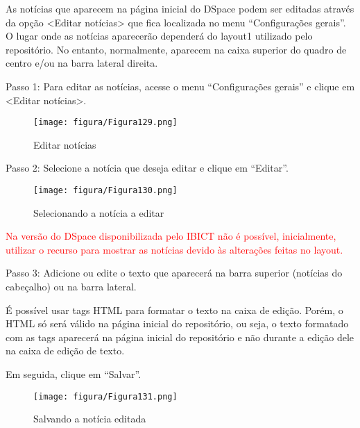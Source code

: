\documentclass[12pt,hidelinks]{article}
\begin{document}
\newpage
    
    As notícias que aparecem na página inicial do DSpace podem ser editadas através da opção <Editar notícias> que fica localizada no menu “Configurações gerais”. O lugar onde as notícias aparecerão dependerá do layout1 utilizado pelo repositório. No entanto, normalmente, aparecem na caixa superior do quadro de centro e/ou na barra lateral direita.
    
    \singlespacing
    
    Passo 1: Para editar as notícias, acesse o menu “Configurações gerais” e clique em <Editar notícias>.
    
    \begin{figure}[!htp]
                \centering
                \texttt{[image: figura/Figura129.png]}
                \caption{Editar notícias}
            \label{Rotulo}
        \end{figure}
    
    Passo 2: Selecione a notícia que deseja editar e clique em “Editar”.
    
    \begin{figure}[!htp]
                \centering
                \texttt{[image: figura/Figura130.png]}
                \caption{Selecionando a notícia a editar}
            \label{Rotulo}
        \end{figure}
    
    \textcolor{red}{Na versão do DSpace disponibilizada pelo IBICT não é possível, inicialmente, utilizar o recurso para mostrar as notícias devido às alterações feitas no layout.}
    
    \singlespacing
    
    Passo 3: Adicione ou edite o texto que aparecerá na barra superior (notícias do cabeçalho) ou na barra lateral.
    
    \singlespacing
    
    É possível usar tags HTML para formatar o texto na caixa de edição. Porém, o HTML só será válido na página inicial do repositório, ou seja, o texto formatado com as tags aparecerá na página inicial do repositório e não durante a edição dele na caixa de edição de texto.
    
    \singlespacing
    
    Em seguida, clique em “Salvar”.
    
\newpage

    \begin{figure}[!htp]
                \centering
                \texttt{[image: figura/Figura131.png]}
                \caption{Salvando a notícia editada}
            \label{Rotulo}
        \end{figure}
    
\end{document}
